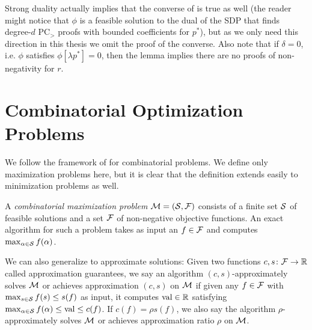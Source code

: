 Strong duality actually implies that the converse of  is true as well (the reader might notice that $\phi$ is a feasible solution to the dual of the SDP that finds degree-$d$ PC$_>$ proofs with bounded coefficients for $p^*$), but as we only need this direction in this thesis we omit the proof of the converse. Also note that if $\delta = 0$, i.e. $\phi$ satisfies $\phi[\lambda p^*] = 0$, then the lemma implies there are no proofs of non-negativity for $r$. 

\section{Combinatorial Optimization Problems}\label{sec:prelims_comb_opt}
We follow the framework of \cite{BPZ15} for combinatorial problems.
We define only maximization problems here, but it is clear that the definition extends easily to minimization problems as well.
\begin{definition}
A \emph{combinatorial maximization problem} \(\mathcal M = (\mathcal S, \mathcal F)\)
consists of a finite set
\(\mathcal S\) of feasible solutions and a set \(\mathcal F\) of non-negative
objective functions. An exact algorithm for such a problem takes as input an $f \in \mathcal F$ and computes
$\max_{\alpha \in \mathcal S} f(\alpha)$.

We can also generalize to approximate solutions: Given two functions \(c,s \colon \mathcal F \rightarrow \mathbb R\)
called approximation guarantees, we say
an algorithm \((c,s)\)-approximately solves \(\mathcal M\) or achieves approximation $(c,s)$ on $\mathcal M$
if given any \(f \in \mathcal F\) with \(\max_{s \in \mathcal S} f(s) \leq s(f)\) as input,
it computes \(\operatorname{val} \in \mathbb R\) satisfying
\(\max_{\alpha \in \mathcal S} f(\alpha) \leq \operatorname{val} \leq c(f)\).
If $c(f) = \rho s(f)$, we also say the algorithm $\rho$-approximately solves $\mathcal M$ or achieves approximation ratio $\rho$ on $\mathcal M$.
\end{definition}

